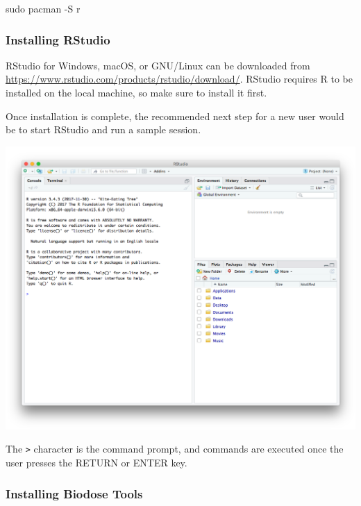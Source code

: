 \documentclass[]{scrartcl}
\newenvironment{Shaded}{\begin{snugshade}}{\end{snugshade}}
\newcommand{\FunctionTok}[1]{\textcolor[rgb]{0.00,0.00,0.00}{#1}}
\newcommand{\NormalTok}[1]{#1}
\begin{document}
\begin{Shaded}
\begin{Highlighting}[]
\FunctionTok{sudo}\NormalTok{ pacman -S r}
\end{Highlighting}
\end{Shaded}

\hypertarget{installing-rstudio}{%
\subsubsection{Installing RStudio}\label{installing-rstudio}}

RStudio for Windows, macOS, or GNU/Linux can be downloaded from \href{https://www.rstudio.com/products/rstudio/download/\#download}{https://www.rstudio.com/products/rstudio/download/}. RStudio requires R to be installed on the local machine, so make sure to install it first.

Once installation is complete, the recommended next step for a new user would be to start RStudio and run a sample session.

\begin{center}\includegraphics[width=11.74in]{images/user-manual/rstudio-mac} \end{center}

The \texttt{\textgreater{}} character is the command prompt, and commands are executed once the user
presses the RETURN or ENTER key.

\hypertarget{installing-biodose-tools}{%
\subsubsection{Installing Biodose Tools}\label{installing-biodose-tools}}
\end{document}
